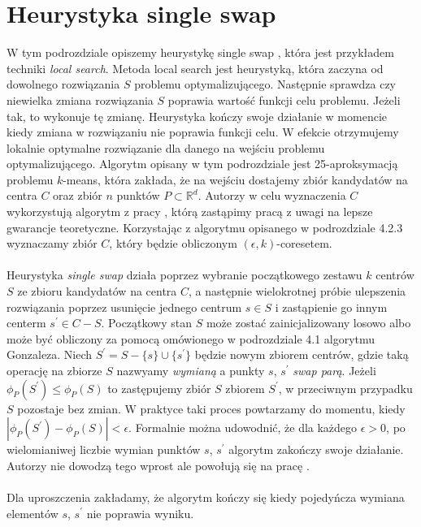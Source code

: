 \section{Heurystyka single swap}

W tym podrozdziale opiszemy heurystykę single swap \cite{Arya2004LocalSH}, która jest przykładem techniki \textit{local search}.
Metoda local search jest heurystyką, która zaczyna od dowolnego rozwiązania $S$ problemu optymalizującego.
Następnie sprawdza czy niewielka zmiana rozwiązania $S$ poprawia wartość funkcji celu problemu.
Jeżeli tak, to wykonuje tę zmianę.
Heurystyka kończy swoje działanie w momencie kiedy zmiana w rozwiązaniu nie poprawia funkcji celu.
W efekcie otrzymujemy lokalnie optymalne rozwiązanie dla danego na wejściu problemu optymalizującego.
Algorytm opisany w tym podrozdziale jest 25-aproksymacją problemu $k$-means, która zakłada, że na wejściu dostajemy zbiór kandydatów na centra $C$ oraz zbiór $n$ punktów $P \subset \mathbb{R}^d$.
Autorzy \cite{Arya2004LocalSH} w celu wyznaczenia $C$ wykorzystują algorytm z pracy \cite{Matousek99onapproximate}, którą zastąpimy pracą \cite{10.1145/1007352.1007400} z uwagi na lepsze gwarancje teoretyczne.
Korzystając z algorytmu opisanego w podrozdziale 4.2.3 wyznaczamy zbiór $C$, który będzie obliczonym $(\epsilon, k)$-coresetem.
\\~\\
Heurystyka \textit{single swap} działa poprzez wybranie początkowego zestawu $k$ centrów $S$ ze zbioru kandydatów na centra $C$, a następnie wielokrotnej
próbie ulepszenia rozwiązania poprzez usunięcie jednego centrum $s \in S$ i zastąpienie go innym centerm $s^{'} \in C - S$.
Początkowy stan $S$ może zostać zainicjalizowany losowo albo może być obliczony za pomocą omówionego w podrozdziale 4.1 algorytmu Gonzaleza.
Niech $S^{'} = S - \{s\} \cup \{s^{'}\}$ będzie nowym zbiorem centrów, gdzie taką operację na zbiorze $S$ nazwyamy \textit{wymianą} a punkty $s$, $s^{'}$ \textit{swap parą}.
Jeżeli $\phi_{P}(S^{'}) \leq \phi_{P}(S)$ to zastępujemy zbiór $S$ zbiorem $S^{'}$, w przeciwnym przypadku $S$ pozostaje bez zmian.
W praktyce taki proces powtarzamy do momentu, kiedy $|\phi_{P}(S^{'}) - \phi_{P}(S) | < \epsilon$.
Formalnie można udowodnić, że dla każdego $\epsilon > 0$, po wielomianiwej liczbie wymian punktów $s$, $s^{'}$ algorytm zakończy swoje działanie.
Autorzy nie dowodzą tego wprost ale powołują się na pracę \cite{10.1145/380752.380755}.
\\~\\
Dla uproszczenia zakładamy, że algorytm kończy się kiedy pojedyńcza wymiana elementów $s$, $s^{'}$ nie poprawia wyniku.
